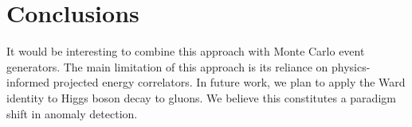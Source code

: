 \section{Conclusions}\label{sec:conclusions}

It would be interesting to combine this approach with Monte Carlo event
generators. The main limitation of this approach is its reliance on
physics-informed projected energy correlators. In future work, we plan
to apply the Ward identity to Higgs boson decay to gluons. We believe
this constitutes a paradigm shift in anomaly detection.


